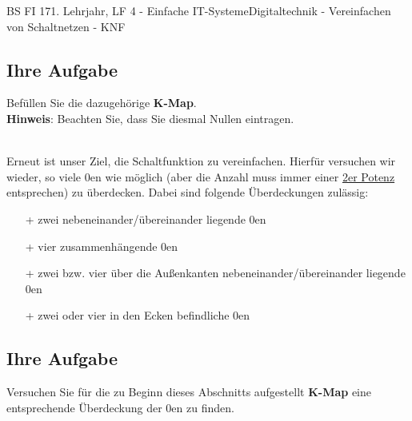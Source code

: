 \documentclass[11pt,twocolumn,oneside,openany,headings=optiontotoc,11pt,numbers=noenddot]{article}
\begin{document}
\begin{worksheet}{BS FI 17}{1. Lehrjahr, LF 4 - Einfache IT-Systeme}{Digitaltechnik - Vereinfachen von Schaltnetzen - KNF}
		\subsection*{Ihre Aufgabe} Befüllen Sie die dazugehörige \textbf{K-Map}.\\
		\small{\textbf{Hinweis}: Beachten Sie, dass Sie diesmal Nullen eintragen.}\normalsize\\
		\begin{karnaugh-map}[4][4][1][$x_3x_4$][$x_1x_2$]
			
		\end{karnaugh-map}\\
		Erneut ist unser Ziel, die Schaltfunktion zu vereinfachen. Hierfür versuchen wir wieder, so viele \(0\)en wie möglich (aber die Anzahl muss immer einer \underline{2er Potenz} entsprechen) zu überdecken. Dabei sind folgende Überdeckungen zulässig:
		\begin{itemize}
			\item[+] zwei nebeneinander/übereinander liegende \(0\)en
			\item[+] vier zusammenhängende \(0\)en
			\item[+] zwei bzw. vier über die Außenkanten nebeneinander/übereinander liegende \(0\)en
			\item[+] zwei oder vier in den Ecken befindliche \(0\)en
		\end{itemize}
		\begin{karnaugh-map}[4][4][1][$x_3x_4$][$x_1x_2$]
		\end{karnaugh-map}
		\begin{karnaugh-map}[4][4][1][$x_3x_4$][$x_1x_2$]
		\end{karnaugh-map}
		\begin{karnaugh-map}[4][4][1][$x_3x_4$][$x_1x_2$]
		\end{karnaugh-map}
		\begin{karnaugh-map}[4][4][1][$x_3x_4$][$x_1x_2$]
			\implicantcorner
		\end{karnaugh-map}
		\subsection*{Ihre Aufgabe} Versuchen Sie für die zu Beginn dieses Abschnitts aufgestellt \textbf{K-Map} eine entsprechende Überdeckung der \(0\)en zu finden.
		\newpage

\end{worksheet}
\end{document}
